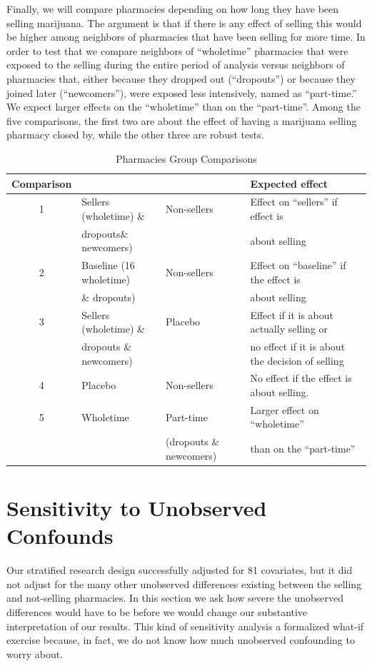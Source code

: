 \documentclass[11pt]{article}
\begin{document}
Finally, we will compare pharmacies depending on how long they have been selling  marijuana. The argument is that if there is any effect of selling this would be higher among neighbors of pharmacies that have been selling for more time. In order to test that we compare neighbors of ``wholetime'' pharmacies that were exposed to the selling during the entire period of analysis versus neighbors of pharmacies that, either because they dropped out (``dropouts'') or because they joined later (``newcomers''), were exposed less intensively, named as ``part-time.'' We expect larger effects on the ``wholetime'' than on the ``part-time''. Among the five comparisons, the first two are about the effect of having a marijuana  selling pharmacy closed by, while the other three are robust tests.

\begin{table}[h]
        \centering
        \footnotesize
        \caption{Pharmacies Group Comparisons}
    \label{tab:comparisons}
    \begin{tabular}{clll}
\hline
Comparison    &		&		&	Expected effect	\\ \hline
1	      &	Sellers (wholetime) \&	&	Non-sellers	&	Effect on ``sellers'' if effect is	\\
	      &	dropouts\& newcomers)	&		&	about selling	\\
2	      &	Baseline (16 wholetime)	&	Non-sellers	&	Effect on ``baseline'' if the effect is 	\\
	      &	\& dropouts)	&		&	about selling	\\
3	      &	Sellers (wholetime) \&	&	Placebo	&	Effect if it is about actually selling or 	\\
	      &	dropouts \& newcomers)	&		&  no effect if it is about the decision of selling	\\
4	      &	Placebo 	&	Non-sellers	&	No effect if the effect is about selling. 	\\
5	      &	Wholetime	&	Part-time	&	Larger effect on ``wholetime'' 	\\
	      &		&	 (dropouts \& newcomers)	&	than on the ``part-time''	\\ \hline
\end{tabular}
\end{table}

\section{Sensitivity to Unobserved Confounds} \label{sec:sensitivity}
Our stratified research design successfully adjusted for 81 covariates, but it did not adjust for the many other unobserved differences existing between the selling and not-selling pharmacies. In this section we ask how severe the unobserved differences would have to be before we would change our substantive interpretation of our results. This kind of sensitivity analysis a formalized what-if exercise because, in fact, we do not know how much unobserved confounding to worry about.
\end{document}

